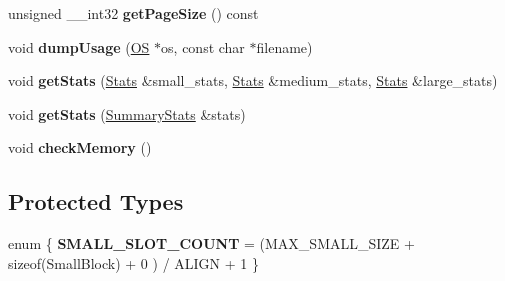 \begin{DoxyCompactItemize}
\item 
unsigned \+\_\+\+\_\+int32 {\bfseries get\+Page\+Size} () const \hypertarget{class_object_script_1_1_o_s_heap_manager_a4b0f487860cd36040ff614668f944b53}{}\label{class_object_script_1_1_o_s_heap_manager_a4b0f487860cd36040ff614668f944b53}

\item 
void {\bfseries dump\+Usage} (\hyperlink{class_object_script_1_1_o_s}{OS} $\ast$os, const char $\ast$filename)\hypertarget{class_object_script_1_1_o_s_heap_manager_a267770954ddd43467e93a105ebc730c9}{}\label{class_object_script_1_1_o_s_heap_manager_a267770954ddd43467e93a105ebc730c9}

\item 
void {\bfseries get\+Stats} (\hyperlink{struct_object_script_1_1_o_s_heap_manager_1_1_stats}{Stats} \&small\+\_\+stats, \hyperlink{struct_object_script_1_1_o_s_heap_manager_1_1_stats}{Stats} \&medium\+\_\+stats, \hyperlink{struct_object_script_1_1_o_s_heap_manager_1_1_stats}{Stats} \&large\+\_\+stats)\hypertarget{class_object_script_1_1_o_s_heap_manager_ac8dc88afb9cc455a342cfd7370f05cbb}{}\label{class_object_script_1_1_o_s_heap_manager_ac8dc88afb9cc455a342cfd7370f05cbb}

\item 
void {\bfseries get\+Stats} (\hyperlink{struct_object_script_1_1_o_s_heap_manager_1_1_summary_stats}{Summary\+Stats} \&stats)\hypertarget{class_object_script_1_1_o_s_heap_manager_a9474409132d2fe79da52da25b0207983}{}\label{class_object_script_1_1_o_s_heap_manager_a9474409132d2fe79da52da25b0207983}

\item 
void {\bfseries check\+Memory} ()\hypertarget{class_object_script_1_1_o_s_heap_manager_a08e596f605cb3bf8cec4923f898f1924}{}\label{class_object_script_1_1_o_s_heap_manager_a08e596f605cb3bf8cec4923f898f1924}

\end{DoxyCompactItemize}
\subsection*{Protected Types}
\begin{DoxyCompactItemize}
\item 
enum \{ {\bfseries S\+M\+A\+L\+L\+\_\+\+S\+L\+O\+T\+\_\+\+C\+O\+U\+NT} = (M\+A\+X\+\_\+\+S\+M\+A\+L\+L\+\_\+\+S\+I\+ZE + sizeof(Small\+Block) + 0 ) / A\+L\+I\+GN + 1
 \}\hypertarget{class_object_script_1_1_o_s_heap_manager_a2f5e5183acf229963cac68c0de0c8b8f}{}\label{class_object_script_1_1_o_s_heap_manager_a2f5e5183acf229963cac68c0de0c8b8f}

\end{DoxyCompactItemize}
